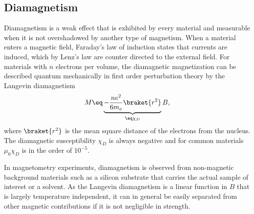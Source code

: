 \documentclass[\main/dresen_thesis.tex]{subfiles}
\begin{document}
  \subsection{Diamagnetism}
    Diamagnetism is a weak effect that is exhibited by every material and measurable when it is not overshadowed by another type of magnetism.
    When a material enters a magnetic field, Faraday's law of induction states that currents are induced, which by Lenz's law are counter directed to the external field.
    For materials with $n$ electrons per volume, the diamagnetic magnetization can be described quantum mechanically in first order perturbation theory by the Langevin diamagnetism \cite{Blundell_2001_Magne}
    \begin{align}
      M \eq \underbrace{- \frac{n e^2}{6 m_e} \braket{r^2}}_{\eq \chi_D} B,
    \end{align}
    where $\braket{r^2}$ is the mean square distance of the electrons from the nucleus.
    The diamagnetic susceptibility $\chi_D$ is always negative and for common materials $\mu_0 \chi_D$ is in the order of $10^{-5}$.

    In magnetometry experiments, diamagnetism is observed from non-magnetic background materials such as a silicon substrate that carries the actual sample of interest or a solvent.
    As the Langevin diamagnetism is a linear function in $B$ that is largely temperature independent, it can in general be easily separated from other magnetic contributions if it is not negligible in strength.
\end{document}

